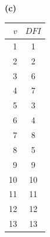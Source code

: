 \documentclass[10pt,a5paper]{book}
\begin{document}
{
  \begin{flushleft}\textbf{(c)}\end{flushleft}
  \begin{tabular}{|r|c|}
  \hline
  $v$ & $DFI$ \\
  \hline
  1 & 1 \\
  \hline
  2 & 2 \\
  \hline
  3 & 6 \\
  \hline
  4 & 7 \\
  \hline
  5 & 3 \\
  \hline
  6 & 4 \\
  \hline
  7 & 8 \\
  \hline
  8 & 5 \\
  \hline
  9 & 9 \\
  \hline
  10 & 10 \\
  \hline
  11 & 11 \\
  \hline
  12 & 12 \\
  \hline
  13 & 13 \\
  \hline
\end{tabular}
}\\
\end{document}
